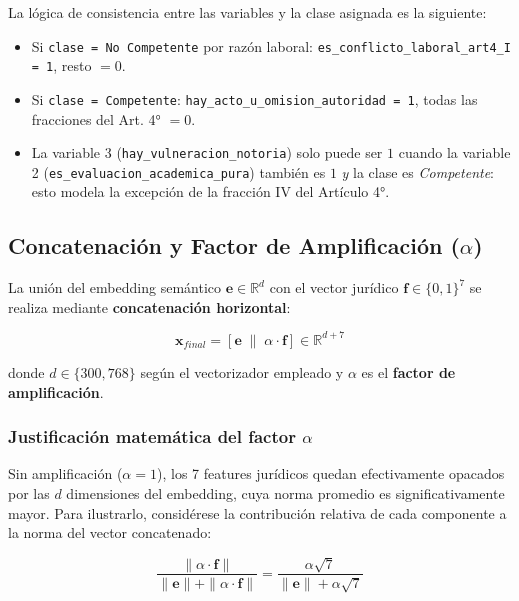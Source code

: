 La lógica de consistencia entre las variables y la clase asignada es la
siguiente:

\begin{itemize}
  \item Si \texttt{clase = No Competente} por razón laboral:
        \texttt{es\_conflicto\_laboral\_art4\_I = 1}, resto $= 0$.
  \item Si \texttt{clase = Competente}: \texttt{hay\_acto\_u\_omision\_autoridad = 1},
        todas las fracciones del Art. 4° $= 0$.
  \item La variable 3 (\texttt{hay\_vulneracion\_notoria}) solo puede ser $1$
        cuando la variable 2 (\texttt{es\_evaluacion\_academica\_pura}) también
        es $1$ \emph{y} la clase es \textit{Competente}: esto modela la excepción
        de la fracción IV del Artículo 4°.
\end{itemize}

\subsection{Concatenación y Factor de Amplificación ($\alpha$)}

La unión del embedding semántico $\mathbf{e} \in \mathbb{R}^d$ con el vector
jurídico $\mathbf{f} \in \{0,1\}^7$ se realiza mediante \textbf{concatenación
horizontal}:

\begin{equation}
  \mathbf{x}_{final}
  = \left[\mathbf{e} \;\|\; \alpha \cdot \mathbf{f}\right]
  \in \mathbb{R}^{d + 7}
  \label{eq:concat}
\end{equation}

donde $d \in \{300, 768\}$ según el vectorizador empleado y $\alpha$ es el
\textbf{factor de amplificación}.

\subsubsection*{Justificación matemática del factor $\alpha$}

Sin amplificación ($\alpha = 1$), los 7 features jurídicos quedan efectivamente
opacados por las $d$ dimensiones del embedding, cuya norma promedio es
significativamente mayor. Para ilustrarlo, considérese la contribución relativa
de cada componente a la norma del vector concatenado:

\begin{equation}
  \frac{\|\alpha \cdot \mathbf{f}\|}{\|\mathbf{e}\| + \|\alpha \cdot \mathbf{f}\|}
  = \frac{\alpha \sqrt{7}}{\|\mathbf{e}\| + \alpha \sqrt{7}}
  \label{eq:contribucion}
\end{equation}

